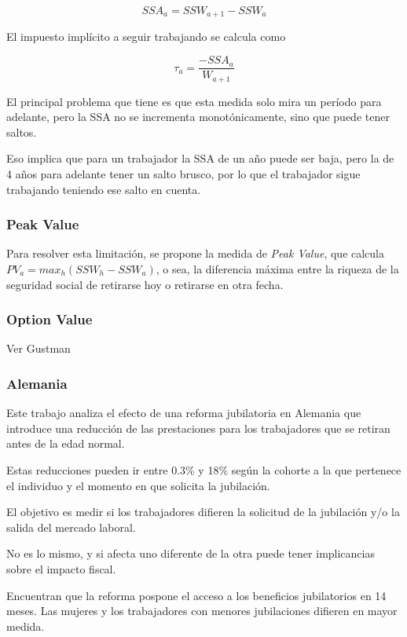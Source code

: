 \documentclass[]{article}
\begin{document}
\[ SSA_{a} = SSW_{a+1} - SSW_{a}\]

El impuesto implícito a seguir trabajando se calcula como

\[ \tau_{a} = \frac{-SSA_{a}}{W_{a+1}}\]

El principal problema que tiene es que esta medida solo mira un período
para adelante, pero la SSA no se incrementa monotónicamente, sino que
puede tener saltos.

Eso implica que para un trabajador la SSA de un año puede ser baja, pero
la de 4 años para adelante tener un salto brusco, por lo que el
trabajador sigue trabajando teniendo ese salto en cuenta.

\hypertarget{peak-value}{%
\subsubsection{Peak Value}\label{peak-value}}

Para resolver esta limitación, se propone la medida de \emph{Peak
Value}, que calcula \(PV_{a} = max_{h}(SSW_{h}-SSW_{a})\), o sea, la
diferencia máxima entre la riqueza de la seguridad social de retirarse
hoy o retirarse en otra fecha.

\hypertarget{option-value}{%
\subsubsection{Option Value}\label{option-value}}

Ver Gustman

\hypertarget{alemania}{%
\subsubsection{Alemania}\label{alemania}}

Este trabajo analiza el efecto de una reforma jubilatoria en Alemania
que introduce una reducción de las prestaciones para los trabajadores
que se retiran antes de la edad normal.

Estas reducciones pueden ir entre 0.3\% y 18\% según la cohorte a la que
pertenece el individuo y el momento en que solicita la jubilación.

El objetivo es medir si los trabajadores difieren la solicitud de la
jubilación y/o la salida del mercado laboral.

No es lo mismo, y si afecta uno diferente de la otra puede tener
implicancias sobre el impacto fiscal.

Encuentran que la reforma pospone el acceso a los beneficios
jubilatorios en 14 meses. Las mujeres y los trabajadores con menores
jubilaciones difieren en mayor medida.
\end{document}
